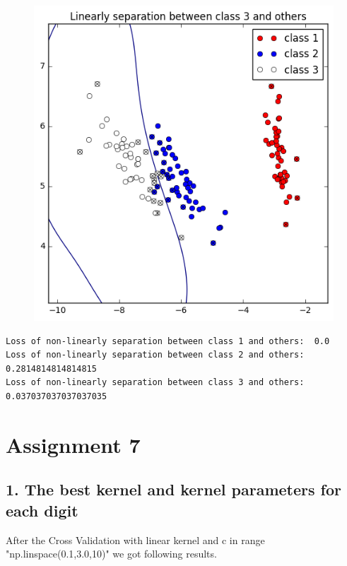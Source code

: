 \documentclass[a4paper,11pt]{article}
\begin{document}
\begin{figure}[htbp]
  \includegraphics[scale=0.3]{nl3_12.png}
\end{figure}

\begin{verbatim}
Loss of non-linearly separation between class 1 and others:  0.0
Loss of non-linearly separation between class 2 and others:  0.2814814814814815
Loss of non-linearly separation between class 3 and others:  0.037037037037037035
\end{verbatim}

\section*{Assignment 7}
\subsection*{1. The best kernel and kernel parameters for each digit}

After the Cross Validation with linear kernel and c in range "np.linspace(0.1,3.0,10)" we got following results.
\end{document}
